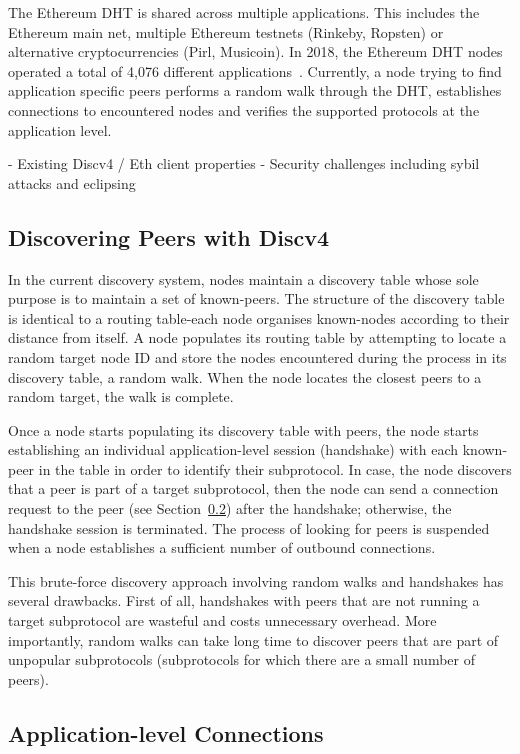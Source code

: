  The Ethereum DHT is shared across multiple applications.  This includes the Ethereum main net, multiple Ethereum testnets (Rinkeby, Ropsten) or alternative cryptocurrencies (Pirl, Musicoin). In 2018, the Ethereum DHT nodes operated a total of 4,076 different applications~\cite{kim2018measuring}. Currently, a node trying to find application specific peers performs a random walk through the DHT, establishes connections to encountered nodes and verifies the supported protocols at the application level. 

- Existing Discv4 / Eth client properties
- Security challenges including sybil attacks and eclipsing

\subsection{Discovering Peers with Discv4}

In the current discovery system, nodes maintain a discovery table whose sole purpose is to maintain a set of known-peers. The structure of the discovery table is identical to a routing table-each node organises known-nodes according to their distance from itself. A node populates its routing table by attempting to locate a random target node ID and store the nodes encountered during the process in its discovery table, \ie a random walk. When the node locates the closest peers to a random target, the walk is complete. 

Once a node starts populating its discovery table with peers, the node starts establishing an individual application-level session (\ie handshake) with each known-peer in the table in order to identify their subprotocol. In case, the node discovers that a peer is part of a target subprotocol, then the node can send a connection request to the peer (see Section~\ref{sec:connections}) after the handshake; otherwise, the handshake session is terminated. The process of looking for peers is suspended when a node establishes a sufficient number of outbound connections.

This brute-force discovery approach involving random walks and handshakes has several drawbacks. First of all, handshakes with peers that are not running a target subprotocol are wasteful and costs unnecessary overhead. More importantly, random walks can take long time to discover peers that are part of unpopular subprotocols (\ie subprotocols for which there are a small number of peers). 

\subsection{Application-level Connections}
\label{sec:connections}

